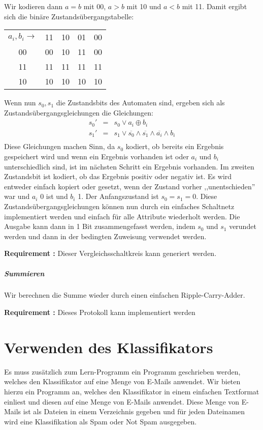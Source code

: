 \documentclass{article}
\newcounter{requirementscount}{}
\newcommand{\requirement}[1] {
        \addtocounter{requirementscount}{1}
        {\bf Requirement \therequirementscount:} #1\\
    }
\begin{document}
Wir kodieren dann \(a = b\) mit 00, \(a > b\) mit 10 und
\(a < b\) mit 11. Damit ergibt sich die bin\"are Zustands\"ubergangstabelle:\\
\begin{center}
\begin{tabular}{c|c c c c}
\(a_i, b_i \rightarrow\) & 11 & 10 & 01 & 00 \\
00 & 00 & 10 & 11 & 00 \\
11 & 11 & 11 & 11 & 11 \\
10 & 10 & 10 & 10 & 10 \\
\end{tabular}
\end{center}
Wenn nun \(s_0, s_1\) die Zustandsbits des Automaten sind, ergeben sich
als Zustands\"ubergangsgleichungen die Gleichungen:
\begin{align}
s_0' &=& s_0 \vee a_i \oplus b_i\\
s_1' &=& s_1 \vee \overline{s_0} \wedge \overline{s_1} \wedge \overline{a_i} \wedge b_i\\
\end{align}
Diese Gleichungen machen Sinn, da \(s_0\) kodiert, ob bereits
ein Ergebnis gespeichert wird und wenn ein Ergebnis vorhanden
ist oder \(a_i\) und \(b_i\) unterschiedlich sind, ist im n\"achsten
Schritt ein Ergebnis vorhanden. Im zweiten Zustandsbit ist kodiert,
ob das Ergebnis positiv oder negativ ist. Es wird entweder einfach
kopiert oder gesetzt, wenn der Zustand vorher ,,unentschieden'' war
und \(a_i\) 0 ist und \(b_i\) 1. Der Anfangszustand ist \(s_0 = s_1 = 0\).
Diese Zustands\"ubergangsgleichungen k\"onnen nun durch ein
einfaches Schaltnetz implementiert werden und einfach f\"ur alle
Attribute wiederholt werden. Die Ausgabe kann dann in 1 Bit zusammengefasst
werden, indem \(s_0\) und \(s_1\) verundet werden und dann in der bedingten
Zuweisung verwendet werden. \\
\requirement{Dieser Vergleichsschaltkreis kann generiert werden.}

\subparagraph{Summieren}
Wir berechnen die Summe wieder durch einen einfachen Ripple-Carry-Adder.\\

\requirement{Dieses Protokoll kann implementiert werden}

\pagebreak  %
\section{Verwenden des Klassifikators}
Es muss zus\"atzlich zum Lern-Programm ein Programm geschrieben
werden, welches den Klassifikator auf eine Menge von E-Mails anwendet.
Wir bieten hierzu ein Programm an, welches den Klassifikator in einem
einfachen Textformat einliest und diesen auf eine Menge von E-Mails
anwendet. Diese Menge von E-Mails ist als Dateien in einem Verzeichnis
gegeben und f\"ur jeden Dateinamen wird eine Klassifikation als Spam
oder Not Spam ausgegeben.
\end{document}
